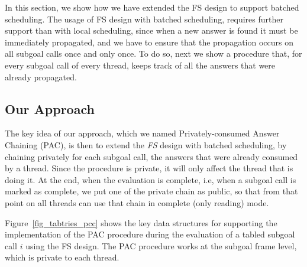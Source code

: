 \documentclass{llncs}
\begin{document}
In this section, we show how we have extended the FS design to support
batched scheduling. The usage of FS design with batched scheduling,
requires further support than with local scheduling, since when a new
answer is found it must be immediately propagated, and we have to
ensure that the propagation occurs on all subgoal calls once and only
once. To do so, next we show a procedure that, for every subgoal call
of every thread, keeps track of all the answers that were already
propagated.


\subsection{Our Approach}

The key idea of our approach, which we named Privately-consumed Answer
Chaining (PAC), is then to extend the \emph{FS} design with batched
scheduling, by chaining privately for each subgoal call, the answers
that were already consumed by a thread. Since the procedure is
private, it will only affect the thread that is doing it. At the end,
when the evaluation is complete, i.e, when a subgoal call is marked as
complete, we put one of the private chain as public, so that from that
point on all threads can use that chain in complete (only reading)
mode.

Figure~\ref{fig_tabtries_pcc} shows the key data structures for
supporting the implementation of the PAC procedure during the
evaluation of a tabled subgoal call $i$ using the FS design. %
The PAC procedure works at the subgoal frame level, which is
private to each thread.
\end{document}
